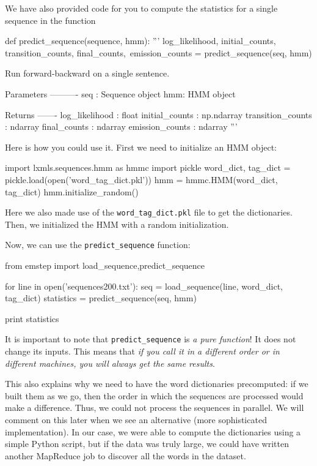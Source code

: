 We have also provided code for you to compute the statistics for a single
sequence in the function 
\begin{python}
def predict_sequence(sequence, hmm):
    '''
    log_likelihood, initial_counts, transition_counts, final_counts,\
            emission_counts = predict_sequence(seq, hmm)

    Run forward-backward on a single sentence.

    Parameters
    ----------
    seq : Sequence object
    hmm: HMM object

    Returns
    -------
    log_likelihood : float
    initial_counts : np.ndarray
    transition_counts : ndarray
    final_counts : ndarray
    emission_counts : ndarray
    '''
\end{python}
Here is how you
could use it. First we need to initialize an HMM object:

\begin{python}
import lxmls.sequences.hmm as hmmc
import pickle
word_dict, tag_dict  = pickle.load(open('word_tag_dict.pkl'))
hmm = hmmc.HMM(word_dict, tag_dict)
hmm.initialize_random()
\end{python}

Here we also made use of the \verb+word_tag_dict.pkl+ file to get the
dictionaries. Then, we initialized the HMM with a random initialization.

Now, we can use the \verb+predict_sequence+ function:

\begin{python}
from emstep import load_sequence,predict_sequence

for line in open('sequences200.txt'):
    seq = load_sequence(line, word_dict, tag_dict)
    statistics = predict_sequence(seq, hmm)
    
print statistics
\end{python}

It is important to note that \verb+predict_sequence+ is \emph{a pure
function}! It does not change its inputs. This means that \emph{if you call it
in a different order or in different machines, you will always get the same
results}.

This also explains why we need to have the word dictionaries precomputed: if we
built them as we go, then the order in which the sequences are processed would
make a difference. Thus, we could not process the sequences in parallel. We
will comment on this later when we see an alternative (more sophisticated
implementation). In our case, we were able to compute the dictionaries using a
simple Python script, but if the data was truly large, we could have written
another MapReduce job to discover all the words in the dataset.

